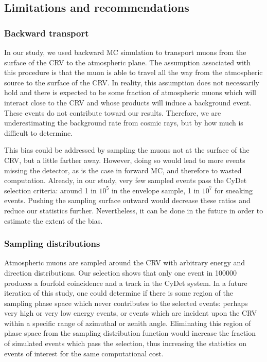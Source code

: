 \subsection{Limitations and recommendations}


\subsubsection{Backward transport}
In our study, we used backward MC simulation to transport muons from the surface
of the CRV to the atmospheric plane. The assumption associated with this
procedure is that the muon is able to travel all the way from the atmospheric
source to the surface of the CRV. In reality, this assumption does not
necessarily hold and there is expected to be some fraction of atmospheric muons
which will interact close to the CRV and whose products will induce a background
event. These events do not contribute toward our results. Therefore, we are
underestimating the background rate from cosmic rays, but by how much is
difficult to determine. 

This bias could be addressed by sampling the muons not at the surface of the
CRV, but a little farther away. However, doing so would lead to more events
missing the detector, as is the case in forward MC, and therefore to wasted
computation. Already, in our study, very few sampled events pass the CyDet
selection criteria: around 1 in $10^5$ in the envelope sample, 1 in $10^7$ for
sneaking events. Pushing the sampling surface outward would decrease these
ratios and reduce our statistics further. Nevertheless, it can be done in the
future in order to estimate the extent of the bias.

\subsubsection{Sampling distributions}

Atmospheric muons are sampled around the CRV with arbitrary energy and direction
distributions. Our selection shows that only one event in \num{100000} produces
a fourfold coincidence and a track in the CyDet system. In a future iteration of
this study, one could determine if there is some region of the sampling phase
space which never contributes to the selected events: perhaps very high or very
low energy events, or events which are incident upon the CRV within a specific
range of azimuthal or zenith angle. Eliminating this region of phase space from
the sampling distribution function would increase the fraction of simulated
events which pass the selection, thus increasing the statistics on events of
interest for the same computational cost.


